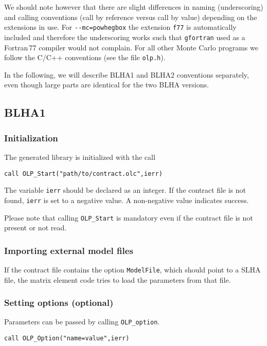 We should note however that there are slight differences in naming (underscoring) and calling
conventions (call by reference versus call by value) depending on the
extensions in use. For \lstinline[style=sh]|--mc=powhegbox| the extension \texttt{f77}
is automatically included and therefore the underscoring works such that
\texttt{gfortran} used as a Fortran\,77 compiler would not complain.
For all other Monte Carlo programs we follow the C/C++ conventions
(see the file \texttt{olp.h}).

In the following, we will describe BLHA1 and BLHA2 conventions separately, 
even though large parts are identical for the two BLHA versions.

\subsection{BLHA1}

\subsubsection{Initialization}
The generated \gosam{} library is initialized with the call
\begin{lstlisting}[style=fortran]
      call OLP_Start("path/to/contract.olc",ierr)
\end{lstlisting}
The variable \texttt{ierr} should be declared as an integer. If the contract
file is not found, \texttt{ierr} is set to a negative value. A non-negative
value indicates success.

Please note that calling \texttt{OLP\_Start} is mandatory even if the contract
file is not present or not read.

\subsubsection{Importing external model files}
If the contract file contains the option
\texttt{ModelFile}, which should point to a SLHA file,
the matrix element code tries to load the parameters from that file.

\subsubsection{Setting options (optional)}
Parameters can be passed by calling \texttt{OLP\_option}.
\begin{lstlisting}[style=fortran]
      call OLP_Option("name=value",ierr)
\end{lstlisting}

